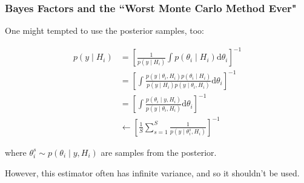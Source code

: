 \documentclass{beamer}
\begin{document}
\begin{frame}
\frametitle{Bayes Factors and the ``Worst Monte Carlo Method Ever" }

One might tempted to use the posterior samples, too:

\begin{align*}
p(y \mid H_i)
&= \left[ \frac{1}{p(y \mid H_i)} \int p(\theta_i \mid  H_i) \text{d}\theta_i \right]^{-1} \\
&= \left[  \int \frac{p(y \mid \theta_i,  H_i)p(\theta_i \mid H_i)}{p(y \mid H_i) p(y \mid \theta_i, H_i) } \text{d}\theta_i \right]^{-1}\\
&= \left[  \int \frac{p(\theta_i\mid y,  H_i) }{p(y \mid \theta_i, H_i) } \text{d}\theta_i \right]^{-1} \\
& \leftarrow  \left[  \frac{1}{S}\sum_{s=1}^S\frac{1 }{p(y \mid \theta_i^s, H_i) } \right]^{-1}
\end{align*}

where $\theta^s_i \sim p(\theta_i\mid y,  H_i)$ are samples from the posterior. 
\newline

However, this estimator often has infinite variance, and so it shouldn't be used. 
\end{frame}

% 
% 
\end{document}
